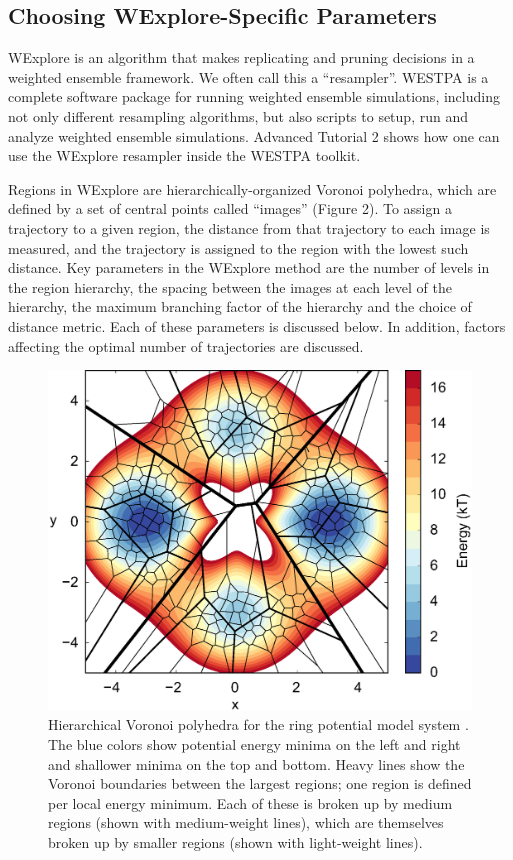 \documentclass[9pt,tutorial,pubversion]{livecoms}
\begin{document}
\subsection{Choosing WExplore-Specific Parameters}

WExplore is an algorithm that makes replicating and pruning decisions in a weighted ensemble framework.  We often call this a “resampler”.  WESTPA is a complete software package for running weighted ensemble simulations, including not only different resampling algorithms, but also scripts to setup, run and analyze weighted ensemble simulations.  Advanced Tutorial 2 shows how one can use the WExplore resampler inside the WESTPA toolkit. 

Regions in WExplore are hierarchically-organized Voronoi polyhedra, which are defined by a set of central points called “images” (Figure 2). 
To assign a trajectory to a given region, the distance from that trajectory to each image is measured, and the trajectory is assigned to the region with the lowest such distance. 
Key parameters in the WExplore method are the number of levels in the region hierarchy, the spacing between the images at each level of the hierarchy, the maximum branching factor of the hierarchy and the choice of distance metric. 
Each of these parameters is discussed below. 
In addition, factors affecting the optimal number of trajectories are discussed.

\begin{figure}
\includegraphics[width=\linewidth]{Figure2.eps}
\caption{Hierarchical Voronoi polyhedra for the ring potential model system \citep{Dickson2009,Adelman2013}.  
The blue colors show potential energy minima on the left and right and shallower minima on the top and bottom. 
Heavy lines show the Voronoi boundaries between the largest regions; one region is defined per local energy minimum.  
Each of these is broken up by medium regions (shown with medium-weight lines), which are themselves broken up by smaller regions (shown with light-weight lines).}
\label{fig:view}
\end{figure}
\end{document}
